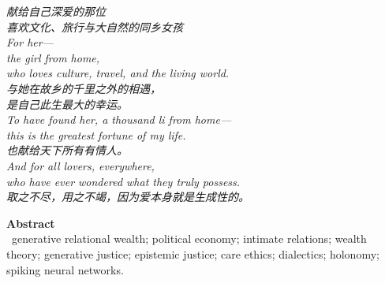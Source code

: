\documentclass[11pt,a4paper]{article}
\begin{document}
\thispagestyle{empty}
\vspace*{4.5cm}
\begin{center}
\begin{minipage}{0.72\linewidth}
\centering\itshape\color{rose}
{\cjk 献给自己深爱的那位}\\[0.4em]
{\cjk 喜欢文化、旅行与大自然的同乡女孩}\\[0.8em]
For her---\\[0.3em]
the girl from home,\\[0.2em]
who loves culture, travel, and the living world.\\[0.8em]
{\cjk 与她在故乡的千里之外的相遇，}\\[0.2em]
{\cjk 是自己此生最大的幸运。}\\[0.6em]
To have found her, a thousand \emph{li} from home---\\[0.2em]
this is the greatest fortune of my life.\\[1.2em]
{\cjk 也献给天下所有有情人。}\\[0.3em]
And for all lovers, everywhere,\\[0.2em]
who have ever wondered what they truly possess.\\[1.0em]
{\upshape\footnotesize\color{gold} {\cjk 取之不尽，用之不竭，因为爱本身就是生成性的。}}
\end{minipage}
\end{center}
\newpage

\thispagestyle{empty}
\noindent\textbf{\large\color{rosedeep} Abstract}\\[0.6em]


\vspace{1.2em}
\, \textcolor{inksoft}{generative relational wealth; political economy; intimate relations; wealth theory; generative justice; epistemic justice; care ethics; dialectics; holonomy; spiking neural networks.}
\newpage

\tableofcontents
\newpage
\end{document}
